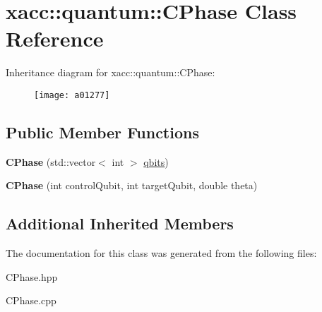 \hypertarget{a01277}{}\section{xacc\+:\+:quantum\+:\+:C\+Phase Class Reference}
\label{a01277}
Inheritance diagram for xacc\+:\+:quantum\+:\+:C\+Phase\+:\begin{figure}[H]
\begin{center}
\leavevmode
\texttt{[image: a01277]}
\end{center}
\end{figure}
\subsection*{Public Member Functions}
\begin{DoxyCompactItemize}
\item 
\mbox{\label{a01277_a5899f838bc4b892d179f51fcf0ac4cc8}} 
{\bfseries C\+Phase} (std\+::vector$<$ int $>$ \hyperlink{a01253_a2a56be6c2519ea65df4d06f4abae1393}{qbits})
\item 
\mbox{\label{a01277_af642f499455f0065279a1e1d178c818f}} 
{\bfseries C\+Phase} (int control\+Qubit, int target\+Qubit, double theta)
\end{DoxyCompactItemize}
\subsection*{Additional Inherited Members}


The documentation for this class was generated from the following files\+:\begin{DoxyCompactItemize}
\item 
C\+Phase.\+hpp\item 
C\+Phase.\+cpp\end{DoxyCompactItemize}
